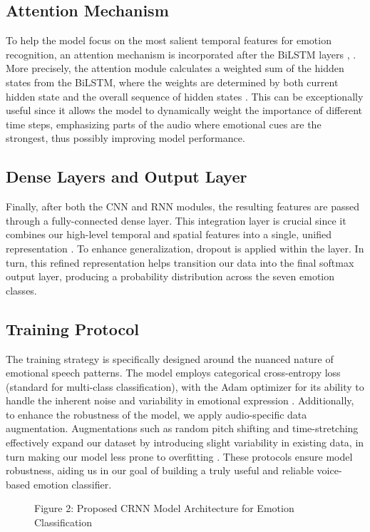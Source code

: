 \documentclass[../main.tex]{subfiles}
\begin{document}
\subsection{Attention Mechanism}
To help the model focus on the most salient temporal features for emotion
recognition, an attention mechanism is incorporated after the BiLSTM layers \citep{Peng2020}, \citep{Chen2018}.
More precisely, the attention module calculates a weighted sum of the hidden
states from the BiLSTM, where the weights are determined by both current hidden
state and the overall sequence of hidden states \citep{Chen2018}. This can be exceptionally
useful since it allows the model to dynamically weight the importance of
different time steps, emphasizing parts of the audio where emotional cues are
the strongest, thus possibly improving model performance.

\subsection{Dense Layers and Output Layer}
Finally, after both the CNN and RNN modules, the resulting features are passed
through a fully-connected dense layer. This integration layer is crucial since
it combines our high-level temporal and spatial features into a single, unified
representation \citep{Chen2018}. To enhance generalization, dropout is applied within the layer.
In turn, this refined representation helps transition our data into the final
softmax output layer, producing a probability distribution across the seven
emotion classes.

\subsection{Training Protocol}
The training strategy is specifically designed around the nuanced nature of
emotional speech patterns. The model employs categorical cross-entropy loss
(standard for multi-class classification), with the Adam optimizer for its
ability to handle the inherent noise and variability in emotional expression \citep{Bhatlawande2024}.
Additionally, to enhance the robustness of the model, we apply audio-specific
data augmentation. Augmentations such as random pitch shifting and
time-stretching effectively expand our dataset by introducing slight variability
in existing data, in turn making our model less prone to overfitting \citep{Bhatlawande2024}. These protocols ensure model robustness, aiding us in our goal of building a truly useful and reliable voice-based emotion classifier.

\begin{figure}[h]
    \centering
    
    \caption{Figure 2: Proposed CRNN Model Architecture for Emotion Classification}
    \label{fig:architecture}
\end{figure}
\end{document}
